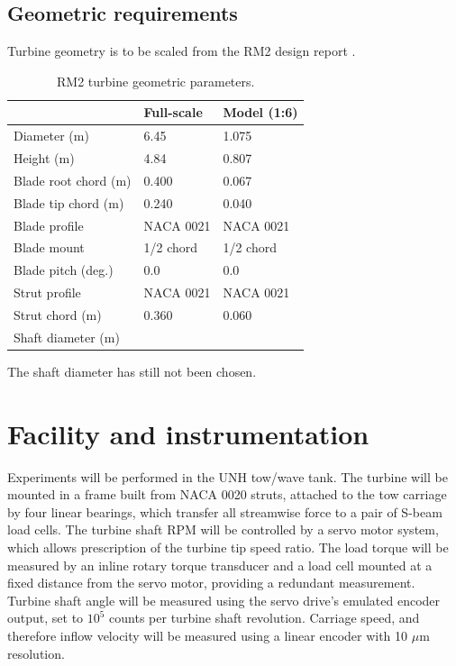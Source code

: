 \documentclass[12pt]{report}
\begin{document}
\subsection{Geometric requirements}

Turbine geometry is to be scaled from the RM2 design report \cite{Barone2011}.

\begin{table}[ht]
\centering
\begin{tabular}{l|l|l}
   & Full-scale & Model (1:6) \\
\hline 
Diameter (m)   & 6.45 & 1.075 \\ 
Height (m)     & 4.84 & 0.807 \\ 
Blade root chord (m) & 0.400 & 0.067 \\ 
Blade tip chord (m)  & 0.240 & 0.040 \\ 
Blade profile & NACA 0021 & NACA 0021 \\ 
Blade mount & 1/2 chord & 1/2 chord \\ 
Blade pitch (deg.) & 0.0 & 0.0 \\ 
Strut profile & NACA 0021 & NACA 0021 \\ 
Strut chord (m) & 0.360 & 0.060 \\ 
Shaft diameter (m) &  &  \\ 
\end{tabular}
\caption{RM2 turbine geometric parameters.}
\end{table}

The shaft diameter has still not been chosen.


\section{Facility and instrumentation}

Experiments will be performed in the UNH tow/wave tank. The turbine will be
mounted in a frame built from NACA 0020 struts, attached to the tow carriage by
four linear bearings, which transfer all streamwise force to a pair of S-beam
load cells. The turbine shaft RPM will be controlled by a servo motor system,
which allows prescription of the turbine tip speed ratio. The load torque will
be measured by an inline rotary torque transducer and a load cell mounted at a
fixed distance from the servo motor, providing a redundant measurement. Turbine
shaft angle will be measured using the servo drive's emulated encoder output,
set to $10^5$ counts per turbine shaft revolution. Carriage speed, and therefore
inflow velocity will be measured using a linear encoder with 10 $\mu$m
resolution.
\end{document}
